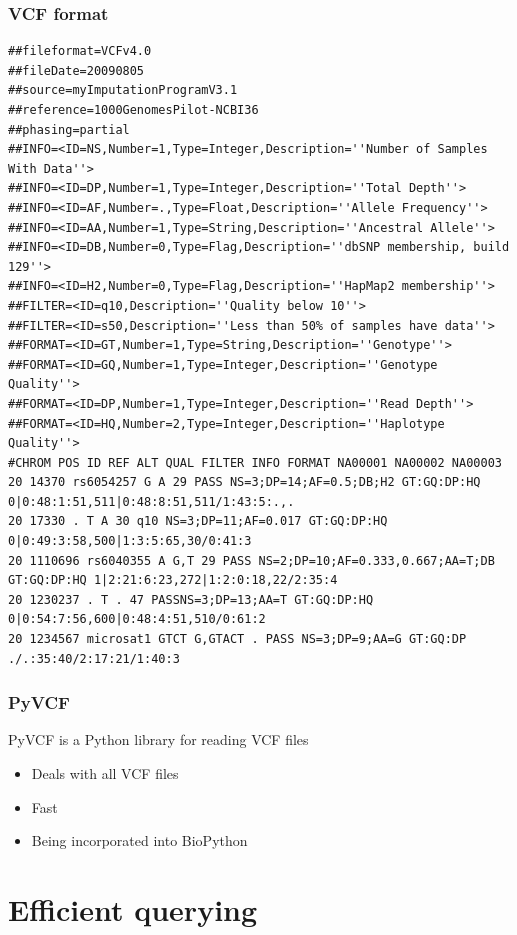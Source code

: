 \documentclass[slidestop]{beamer}
\begin{document}
\begin{frame}[fragile]
  \frametitle{VCF format}
  {\tiny
  \begin{verbatim}
##fileformat=VCFv4.0
##fileDate=20090805
##source=myImputationProgramV3.1
##reference=1000GenomesPilot-NCBI36
##phasing=partial
##INFO=<ID=NS,Number=1,Type=Integer,Description=''Number of Samples With Data''>
##INFO=<ID=DP,Number=1,Type=Integer,Description=''Total Depth''>
##INFO=<ID=AF,Number=.,Type=Float,Description=''Allele Frequency''>
##INFO=<ID=AA,Number=1,Type=String,Description=''Ancestral Allele''>
##INFO=<ID=DB,Number=0,Type=Flag,Description=''dbSNP membership, build 129''>
##INFO=<ID=H2,Number=0,Type=Flag,Description=''HapMap2 membership''>
##FILTER=<ID=q10,Description=''Quality below 10''>
##FILTER=<ID=s50,Description=''Less than 50% of samples have data''>
##FORMAT=<ID=GT,Number=1,Type=String,Description=''Genotype''>
##FORMAT=<ID=GQ,Number=1,Type=Integer,Description=''Genotype Quality''>
##FORMAT=<ID=DP,Number=1,Type=Integer,Description=''Read Depth''>
##FORMAT=<ID=HQ,Number=2,Type=Integer,Description=''Haplotype Quality''>
#CHROM POS ID REF ALT QUAL FILTER INFO FORMAT NA00001 NA00002 NA00003
20 14370 rs6054257 G A 29 PASS NS=3;DP=14;AF=0.5;DB;H2 GT:GQ:DP:HQ 0|0:48:1:51,511|0:48:8:51,511/1:43:5:.,.
20 17330 . T A 30 q10 NS=3;DP=11;AF=0.017 GT:GQ:DP:HQ 0|0:49:3:58,500|1:3:5:65,30/0:41:3
20 1110696 rs6040355 A G,T 29 PASS NS=2;DP=10;AF=0.333,0.667;AA=T;DB GT:GQ:DP:HQ 1|2:21:6:23,272|1:2:0:18,22/2:35:4
20 1230237 . T . 47 PASSNS=3;DP=13;AA=T GT:GQ:DP:HQ 0|0:54:7:56,600|0:48:4:51,510/0:61:2
20 1234567 microsat1 GTCT G,GTACT . PASS NS=3;DP=9;AA=G GT:GQ:DP ./.:35:40/2:17:21/1:40:3
  \end{verbatim}}
\end{frame}

\begin{frame}
  \frametitle{PyVCF}
  PyVCF is a Python library for reading VCF files
  \begin{itemize}
    \item Deals with all VCF files
    \item Fast
    \item Being incorporated into BioPython
  \end{itemize}
\end{frame}

\section{Efficient querying}
\end{document}
